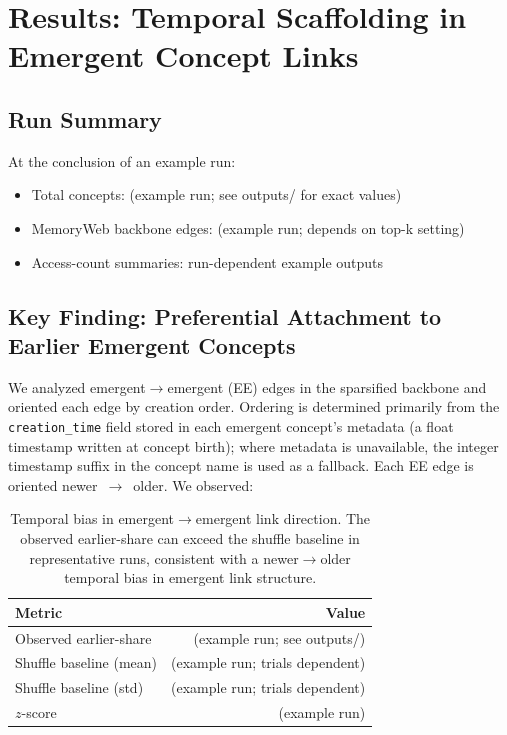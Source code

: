 \documentclass[11pt,a4paper]{article}
\begin{document}
\section{Results: Temporal Scaffolding in Emergent Concept Links}

\subsection{Run Summary}

At the conclusion of an example run:

\begin{itemize}[nosep]
    \item Total concepts: (example run; see outputs/ for exact values)
    \item MemoryWeb backbone edges: (example run; depends on top-k setting)
    \item Access-count summaries: run-dependent example outputs
\end{itemize}

\subsection{Key Finding: Preferential Attachment to Earlier Emergent Concepts}

We analyzed emergent$\to$emergent (EE) edges in the sparsified backbone and 
oriented each edge by creation order. Ordering is determined primarily from 
the \texttt{creation\_time} field stored in each emergent concept's metadata 
(a float timestamp written at concept birth); where metadata is unavailable, 
the integer timestamp suffix in the concept name is used as a fallback. Each 
EE edge is oriented newer~$\to$~older. We observed:

\begin{table}[H]
\centering
\begin{tabular}{lr}
\toprule
\textbf{Metric} & \textbf{Value} \\
\midrule
Observed earlier-share & (example run; see outputs/) \\
Shuffle baseline (mean) & (example run; trials dependent) \\
Shuffle baseline (std) & (example run; trials dependent) \\
$z$-score & (example run) \\
\bottomrule
\end{tabular}
\caption{Temporal bias in emergent$\to$emergent link direction. The observed 
earlier-share can exceed the shuffle baseline in representative runs,
consistent with a newer$\to$older temporal bias in emergent link structure.}
\label{tab:scaffolding}
\end{table}
\end{document}
